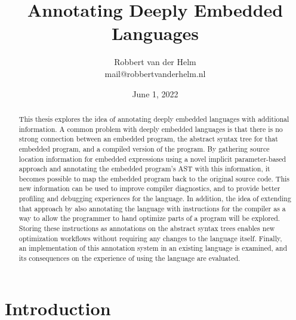\documentclass[fontsize=11pt,a4paper,parskip=half,numbers=noenddot]{scrartcl}
\title{Annotating Deeply Embedded Languages}
\author{
    Robbert van der Helm\\
    \small{mail@robbertvanderhelm.nl}
}
\date{June 1, 2022}
\begin{document}
\maketitle

\begin{abstract}
  This thesis explores the idea of annotating deeply embedded languages with
  additional information. A common problem with deeply embedded languages is
  that there is no strong connection between an embedded program, the abstract
  syntax tree for that embedded program, and a compiled version of the program.
  By gathering source location information for embedded expressions using a
  novel implicit parameter-based approach and annotating the embedded program's
  AST with this information, it becomes possible to map the embedded program
  back to the original source code. This new information can be used to improve
  compiler diagnostics, and to provide better profiling and debugging
  experiences for the language. In addition, the idea of extending that approach
  by also annotating the language with instructions for the compiler as a way to
  allow the programmer to hand optimize parts of a program will be explored.
  Storing these instructions as annotations on the abstract syntax trees enables
  new optimization workflows without requiring any changes to the language
  itself. Finally, an implementation of this annotation system in an existing
  language is examined, and its consequences on the experience of using the
  language are evaluated.
\end{abstract}

\tableofcontents

\section{Introduction}

\end{document}

